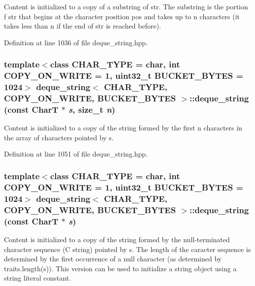 Content is initialized to a copy of a substring of str. The substring is the portion f str that begins at the character position pos and takes up to n characters (it takes less than n if the end of str is reached before). 

Definition at line 1036 of file deque\_\-string.hpp.\hypertarget{classdeque__string_8dc178199327b360d1c7e437ab872421}{
\subsubsection[{deque\_\-string}]{\setlength{\rightskip}{0pt plus 5cm}template$<$class CHAR\_\-TYPE  = char, int COPY\_\-ON\_\-WRITE = 1, uint32\_\-t BUCKET\_\-BYTES = 1024$>$ {\bf deque\_\-string}$<$ CHAR\_\-TYPE, COPY\_\-ON\_\-WRITE, BUCKET\_\-BYTES $>$::{\bf deque\_\-string} (const CharT $\ast$ {\em s}, \/  size\_\-t {\em n})}}
\label{classdeque__string_8dc178199327b360d1c7e437ab872421}


Content is initialized to a copy of the string formed by the first n characters in the array of characters pointed by s. 

Definition at line 1051 of file deque\_\-string.hpp.\hypertarget{classdeque__string_6f787b1cd7c34cc81aa9c9e32e7558ce}{
\subsubsection[{deque\_\-string}]{\setlength{\rightskip}{0pt plus 5cm}template$<$class CHAR\_\-TYPE  = char, int COPY\_\-ON\_\-WRITE = 1, uint32\_\-t BUCKET\_\-BYTES = 1024$>$ {\bf deque\_\-string}$<$ CHAR\_\-TYPE, COPY\_\-ON\_\-WRITE, BUCKET\_\-BYTES $>$::{\bf deque\_\-string} (const CharT $\ast$ {\em s})}}
\label{classdeque__string_6f787b1cd7c34cc81aa9c9e32e7558ce}


Content is initialized to a copy of the string formed by the null-terminated character sequence (C string) pointed by s. The length of the caracter sequence is determined by the first occurrence of a null character (as determined by traits.length(s)). This version can be used to initialize a string object using a string literal constant. 

